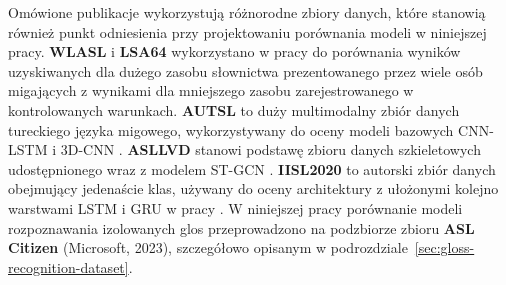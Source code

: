 Omówione publikacje wykorzystują różnorodne zbiory danych, które stanowią również
punkt odniesienia przy projektowaniu porównania modeli w niniejszej pracy.
\textbf{WLASL} i \textbf{LSA64} wykorzystano w pracy \cite{bohacek2022spoter}
do porównania wyników uzyskiwanych dla dużego zasobu słownictwa prezentowanego
przez wiele osób migających z wynikami dla mniejszego zasobu zarejestrowanego
w kontrolowanych warunkach. \textbf{AUTSL} to duży multimodalny zbiór danych
tureckiego języka migowego, wykorzystywany do oceny modeli bazowych CNN-LSTM
 i 3D-CNN \cite{modalities2022review}. \textbf{ASLLVD} stanowi podstawę zbioru danych
szkieletowych udostępnionego wraz z modelem ST-GCN \cite{correia2019stgcn}.
\textbf{IISL2020} to autorski zbiór danych obejmujący jedenaście klas, używany
do oceny architektury z ułożonymi kolejno warstwami LSTM i GRU
w pracy \cite{deepsign2022}. W niniejszej pracy porównanie modeli rozpoznawania
izolowanych glos przeprowadzono na podzbiorze zbioru \textbf{ASL Citizen}
(Microsoft, 2023), szczegółowo opisanym
w podrozdziale~\ref{sec:gloss-recognition-dataset}.

